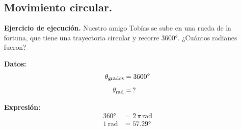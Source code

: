 \documentclass[12pt, letter]{exam}
\begin{document}
\begin{questions}

    \section{Movimiento circular.}

    \setcounter{question}{10} \question \textbf{Ejercicio de ejecución.} Nuestro amigo Tobías se sube en una rueda de la fortuna, que tiene una trayectoria circular y recorre \ang{3600}. ¿Cuántos radianes fueron?

    \vspace*{0.3cm}
    \begin{minipage}[t]{0.4\linewidth}
    \textbf{Datos:}
    \begin{align*}
    \theta_{\text{grados}} &= \ang{3600} \\[0.5em]
    \theta_{\text{\unit{rad}}} &= \, ?
    \end{align*}
    \end{minipage}
    \hspace{1cm}
    \begin{minipage}[t]{0.4\linewidth}
    \textbf{Expresión:}
    \begin{align*}
    \ang{360} &= 2 \, \pi \, \unit{\radian} \\
    \SI{1}{\radian} &= \ang{57.29}
    \end{align*}
    \end{minipage}


\end{questions}
\end{document}
